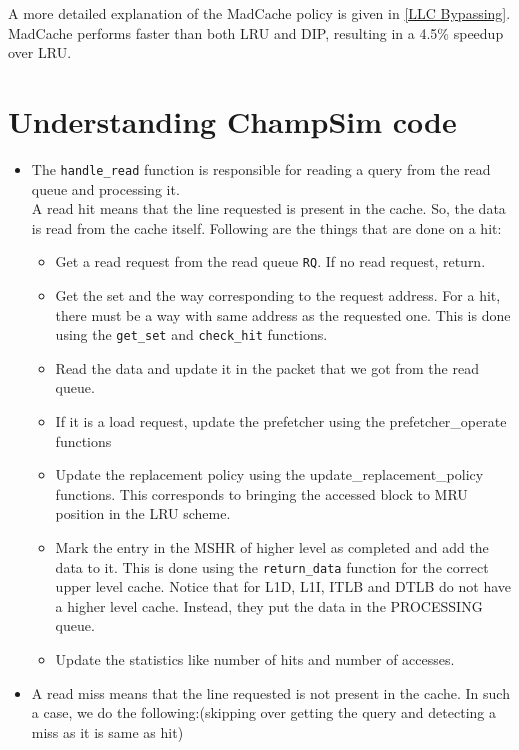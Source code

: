 \documentclass[11pt, swedish, openany]{book}
\begin{document}
A more detailed explanation of the MadCache policy is given in \autoref{LLC Bypassing}. \\

MadCache performs faster than both LRU and DIP, resulting in a 4.5\% speedup over LRU.


\section{Understanding ChampSim code}
\begin{itemize}
    \item The \texttt{handle\_read} function is responsible for reading a query from the read queue and processing it.\\
          A read hit means that the line requested is present in the cache. So, the data is read from the cache itself. Following are the things that are done on a hit:
          \begin{itemize}
              \item Get a read request from the read queue \texttt{RQ}. If no read request, return.
              \item Get the set and the way corresponding to the request address. For a hit, there must be a way with same address as the requested one. This is done using the \texttt{get\_set} and \texttt{check\_hit} functions.
              \item Read the data and update it in the packet that we got from the read queue.
              \item If it is a load request, update the prefetcher using the prefetcher\_operate functions
              \item Update the replacement policy using the update\_replacement\_policy functions. This corresponds to bringing the accessed block to MRU position in the LRU scheme.
              \item Mark the entry in the MSHR of higher level as completed and add the data to it. This is done using the \texttt{return\_data} function for the correct upper level cache. Notice that for L1D, L1I, ITLB and DTLB do not have a higher level cache. Instead, they put the data in the PROCESSING queue.
              \item Update the statistics like number of hits and number of accesses.
          \end{itemize}
    \item A read miss means that the line requested is not present in the cache. In such a case, we do the following:(skipping over getting the query and detecting a miss as it is same as hit)

\end{itemize}
\end{document}
